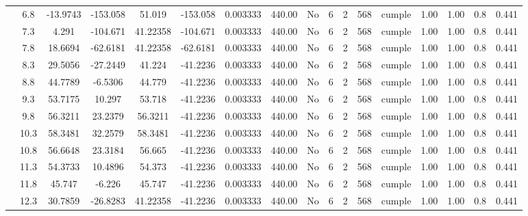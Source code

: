 \begin{table}[H]
{\begin{tabular}{|c|c|c|c|c|c|c|c|c|c|c|c|c|c|c|c|c|}
\cline{2-17}    & \cellcolor[rgb]{ .851,  .882,  .949}6.8 & -13.9743 & -153.058 & 51.019 & -153.058 & 0.003333 & 440.00 & No  & 6   & 2   & 568 & \cellcolor[rgb]{ .776,  .937,  .808}cumple & 1.00 & 1.00 & 0.8 & 0.441 \bigstrut\\
\cline{2-17}    & 7.3 & 4.291 & -104.671 & 41.22358 & -104.671 & 0.003333 & 440.00 & No  & 6   & 2   & 568 & \cellcolor[rgb]{ .776,  .937,  .808}cumple & 1.00 & 1.00 & 0.8 & 0.441 \bigstrut\\
\cline{2-17}    & 7.8 & 18.6694 & -62.6181 & 41.22358 & -62.6181 & 0.003333 & 440.00 & No  & 6   & 2   & 568 & \cellcolor[rgb]{ .776,  .937,  .808}cumple & 1.00 & 1.00 & 0.8 & 0.441 \bigstrut\\
\cline{2-17}    & 8.3 & 29.5056 & -27.2449 & 41.224 & -41.2236 & 0.003333 & 440.00 & No  & 6   & 2   & 568 & \cellcolor[rgb]{ .776,  .937,  .808}cumple & 1.00 & 1.00 & 0.8 & 0.441 \bigstrut\\
\cline{2-17}    & 8.8 & 44.7789 & -6.5306 & 44.779 & -41.2236 & 0.003333 & 440.00 & No  & 6   & 2   & 568 & \cellcolor[rgb]{ .776,  .937,  .808}cumple & 1.00 & 1.00 & 0.8 & 0.441 \bigstrut\\
\cline{2-17}    & 9.3 & 53.7175 & 10.297 & 53.718 & -41.2236 & 0.003333 & 440.00 & No  & 6   & 2   & 568 & \cellcolor[rgb]{ .776,  .937,  .808}cumple & 1.00 & 1.00 & 0.8 & 0.441 \bigstrut\\
\cline{2-17}    & 9.8 & 56.3211 & 23.2379 & 56.3211 & -41.2236 & 0.003333 & 440.00 & No  & 6   & 2   & 568 & \cellcolor[rgb]{ .776,  .937,  .808}cumple & 1.00 & 1.00 & 0.8 & 0.441 \bigstrut\\
\cline{2-17}    & 10.3 & 58.3481 & 32.2579 & 58.3481 & -41.2236 & 0.003333 & 440.00 & No  & 6   & 2   & 568 & \cellcolor[rgb]{ .776,  .937,  .808}cumple & 1.00 & 1.00 & 0.8 & 0.441 \bigstrut\\
\cline{2-17}    & 10.8 & 56.6648 & 23.3184 & 56.665 & -41.2236 & 0.003333 & 440.00 & No  & 6   & 2   & 568 & \cellcolor[rgb]{ .776,  .937,  .808}cumple & 1.00 & 1.00 & 0.8 & 0.441 \bigstrut\\
\cline{2-17}    & 11.3 & 54.3733 & 10.4896 & 54.373 & -41.2236 & 0.003333 & 440.00 & No  & 6   & 2   & 568 & \cellcolor[rgb]{ .776,  .937,  .808}cumple & 1.00 & 1.00 & 0.8 & 0.441 \bigstrut\\
\cline{2-17}    & 11.8 & 45.747 & -6.226 & 45.747 & -41.2236 & 0.003333 & 440.00 & No  & 6   & 2   & 568 & \cellcolor[rgb]{ .776,  .937,  .808}cumple & 1.00 & 1.00 & 0.8 & 0.441 \bigstrut\\
\cline{2-17}    & 12.3 & 30.7859 & -26.8283 & 41.22358 & -41.2236 & 0.003333 & 440.00 & No  & 6   & 2   & 568 & \cellcolor[rgb]{ .776,  .937,  .808}cumple & 1.00 & 1.00 & 0.8 & 0.441 \bigstrut\\

\end{tabular}}
\end{table}

